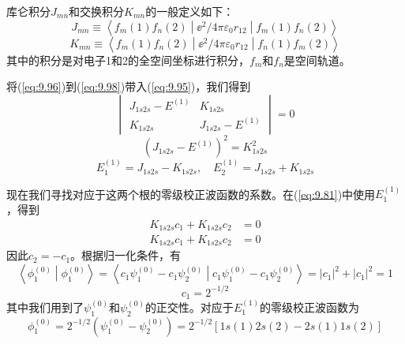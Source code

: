     库仑积分$J_{mn}$和交换积分$K_{mn}$的一般定义如下：
    \begin{equation}
        J_{mn} \equiv \left\langle f_m(1) f_n(2) \middle| \ee ^2/4\pi\varepsilon_0 r_{12} \middle| f_m(1) f_n(2) \right\rangle
        \label{eq:9.99}
    \end{equation}
    \begin{equation}
        K_{mn} \equiv \left\langle f_m(1) f_n(2) \middle| \ee ^2/4\pi\varepsilon_0 r_{12} \middle| f_n(1) f_m(2) \right\rangle
        \label{eq:9.100}
    \end{equation}
    其中的积分是对电子1和2的全空间坐标进行积分，$f_m$和$f_n$是空间轨道。

    将(\ref{eq:9.96})到(\ref{eq:9.98})带入(\ref{eq:9.95})，我们得到
    \begin{equation}
        \begin{vmatrix}
            J_{1s2s} - E^{\left(1\right)} & K_{1s2s} \\
            K_{1s2s} & J_{1s2s} - E^{\left(1\right)}
        \end{vmatrix} = 0
        \label{eq:9.101}
    \end{equation}
    \begin{equation*}
        \left(J_{1s2s} - E^{\left(1\right)}\right)^2 = K_{1s2s}^2
    \end{equation*}
    \begin{equation}
        E_1^{\left(1\right)} = J_{1s2s} - K_{1s2s}, \quad E_2^{\left(1\right)} = J_{1s2s} + K_{1s2s}
        \label{eq:9.102}
    \end{equation}

    现在我们寻找对应于这两个根的零级校正波函数的系数。在(\ref{eq:9.81})中使用$E_{1}^{\left(1\right)}$，得到
    \begin{equation*}
        \begin{aligned}
            K_{1s2s}c_1 + K_{1s2s}c_2 &= 0 \\
            K_{1s2s}c_1 + K_{1s2s}c_2 &= 0
        \end{aligned}
    \end{equation*}
    因此$c_2 = -c_1$。根据归一化条件，有
    \begin{equation*}
        \left\langle \phi_1^{(0)} \middle| \phi_1^{(0)} \right\rangle = \left\langle c_1 \psi_1^{(0)} - c_1 \psi_2^{(0)} \middle| c_1 \psi_1^{(0)} - c_1 \psi_2^{(0)} \right\rangle = |c_1|^2 + |c_1|^2 = 1
    \end{equation*}
    \begin{equation*}
        c_1 = 2^{-1/2}
    \end{equation*}
    其中我们用到了$\psi_1^{(0)}$和$\psi_2^{(0)}$的正交性。对应于$E_1^{(1)}$的零级校正波函数为
    \begin{equation}
        \phi_{1}^{(0)} = 2^{-1/2} \left(\psi_{1}^{(0)} - \psi_{2}^{(0)}\right) = 2^{-1/2} \left[ 1s(1)2s(2) - 2s(1)1s(2) \right]
        \label{eq:9.103}
    \end{equation}

